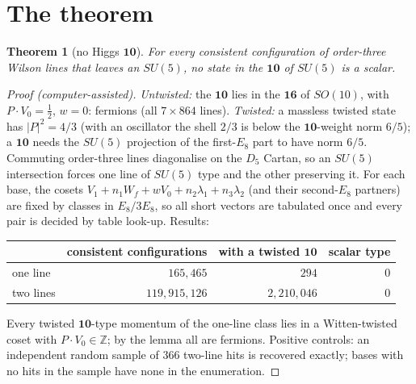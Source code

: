 \documentclass[11pt]{article}
\newtheorem{theorem}{Theorem}
\begin{document}
\section{The theorem}
\begin{theorem}[no Higgs $\mathbf{10}$]
For every consistent configuration of order-three Wilson lines that leaves an $SU(5)$, no state in the $\mathbf{10}$ of $SU(5)$ is a scalar.
\end{theorem}
\begin{proof}[Proof (computer-assisted)]
\emph{Untwisted:} the $\mathbf{10}$ lies in the $\mathbf{16}$ of $SO(10)$, with $P\cdot V_0=\tfrac12$, $w=0$: fermions (all $7\times864$ lines).
\emph{Twisted:} a massless twisted state has $|P|^2=4/3$ (with an oscillator the shell $2/3$ is below the $\mathbf{10}$-weight norm $6/5$);
a $\mathbf{10}$ needs the $SU(5)$ projection of the first-$E_8$ part to have norm $6/5$. Commuting order-three lines diagonalise on the
$D_5$ Cartan, so an $SU(5)$ intersection forces one line of $SU(5)$ type and the other preserving it. For each base, the cosets
$V_1+n_1W_f+wV_0+n_2\lambda_1+n_3\lambda_2$ (and their second-$E_8$ partners) are fixed by classes in $E_8/3E_8$, so all short vectors are
tabulated once and every pair is decided by table look-up. Results:
\begin{center}\begin{tabular}{lrrr}
\toprule
& consistent configurations & with a twisted $\mathbf{10}$ & scalar type\\
\midrule
one line & $165{,}465$ & $294$ & $0$\\
two lines & $119{,}915{,}126$ & $2{,}210{,}046$ & $0$\\
\bottomrule
\end{tabular}\end{center}
Every twisted $\mathbf{10}$-type momentum of the one-line class lies in a Witten-twisted coset with $P\cdot V_0\in\mathbb Z$; by the lemma
all are fermions. Positive controls: an independent random sample of $366$ two-line hits is recovered exactly; bases with no hits in the
sample have none in the enumeration.
\end{proof}
\end{document}
